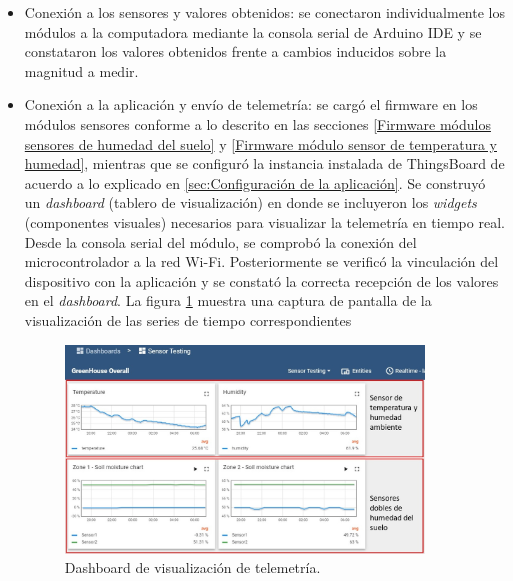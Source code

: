 \begin{itemize}
\item Conexión a los sensores y valores obtenidos: se conectaron individualmente los módulos a la computadora mediante la consola serial de Arduino IDE y se constataron los valores obtenidos frente a cambios inducidos sobre la magnitud a medir.


\item Conexión a la aplicación y envío de telemetría: se cargó el firmware en los módulos sensores conforme a lo descrito en las secciones \ref{Firmware módulos sensores de humedad del suelo} y \ref{Firmware módulo sensor de temperatura y humedad}, mientras que se configuró la instancia instalada de ThingsBoard de acuerdo a lo explicado en \ref{sec:Configuración de la aplicación}. Se construyó un \textit{dashboard} (tablero de visualización) en donde se incluyeron los \textit{widgets} (componentes visuales) necesarios para visualizar la telemetría en tiempo real.
Desde la consola serial del módulo, se comprobó la  conexión del microcontrolador a la red Wi-Fi. Posteriormente se verificó la vinculación del dispositivo con la aplicación y se constató la correcta recepción de los valores en el \textit{dashboard}. La figura \ref{fig:dashboard} muestra una captura de pantalla de la visualización de las series de tiempo correspondientes

\begin{figure}[!h]
	\centering
	\includegraphics[width=0.90\textwidth]{./Figures/chapter4/dashboard.jpg}
	\caption[Dashboard de visualización de telemetría]{Dashboard de visualización de telemetría.}
	\label{fig:dashboard}
\end{figure}





\end{itemize}
